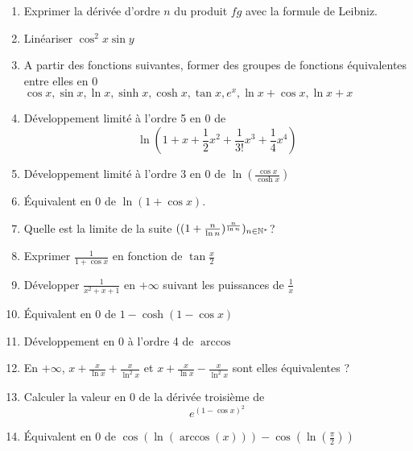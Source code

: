\begin{enumerate}
\item Exprimer la d{\'e}riv{\'e}e d'ordre $n$ du produit $fg$ avec la
formule de Leibniz.\bigskip\bigskip
\item Lin{\'e}ariser $\cos^2 x \sin y$\bigskip
\item A partir des fonctions suivantes, former des groupes de
fonctions {\'e}quivalentes entre elles en 0 $\cos x, \sin x, \ln x,
\sinh x, \cosh x, \tan x, e^x, \ln x + \cos x, \ln x
+x$\bigskip\bigskip\bigskip\bigskip
\item D{\'e}veloppement limit{\'e} {\`a} l'ordre 5 en 0 de
\[\ln(1+x+\frac{1}{2}x^2+\frac{1}{3!}x^3+\frac{1}{4}x^4)\]\bigskip
\bigskip
\item D{\'e}veloppement limit{\'e} {\`a} l'ordre 3 en 0 de $\ln(\frac{\cos x}{\cosh x})$\bigskip
\item {\'E}quivalent en 0 de $\ln(1+\cos x)$.\bigskip
\item Quelle est la limite de la suite
$((1+\frac{n}{\ln n})^{\frac{n}{\ln n}})_{n\in  \Bbb{N}^{*}}$?\bigskip
\item Exprimer $\frac{1}{1+\cos x}$ en fonction de $\tan
\frac{x}{2}$\bigskip
\item D{\'e}velopper $\frac{1}{x^2+x+1}$ en $+\infty$ suivant les
puissances de $\frac{1}{x}$\bigskip
\item {\'E}quivalent en 0 de $1-\cosh(1-\cos x)$\bigskip
\item D{\'e}veloppement en 0 {\`a} l'ordre 4 de $\arccos$\bigskip \bigskip
\item En $+\infty$, $x+\frac{x}{\ln x}+\frac{x}{\ln ^2 x}$ et
$x+\frac{x}{\ln x}-\frac{x}{\ln ^2 x}$ sont elles {\'e}quivalentes
?\bigskip
\item Calculer la valeur en 0 de la d{\'e}riv{\'e}e troisi{\`e}me de
\[e^{(1-\cos x)^2}\]\bigskip
\item {\'E}quivalent en 0 de
$\cos(\ln(\arccos(x)))-\cos(\ln(\frac{\pi}{2}))$
\end{enumerate}

